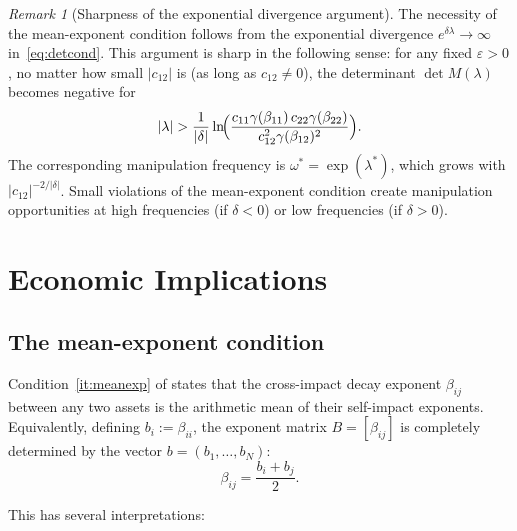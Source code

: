 \documentclass[12pt]{article}
\theoremstyle{definition}
\theoremstyle{remark}
\newtheorem{remark}[theorem]{Remark}
\begin{document}
\begin{remark}[Sharpness of the exponential divergence argument]\label{rem:sharpness}
The necessity of the mean-exponent condition follows from the exponential divergence
$e^{\delta\lambda}\to\infty$ in~\eqref{eq:detcond}.  This argument is sharp in the
following sense: for any fixed $\varepsilon > 0$, no matter how small $|c_{12}|$ is
(as long as $c_{12}\neq 0$), the determinant $\det M(\lambda)$ becomes negative for
\[
  |\lambda| > \frac{1}{|\delta|}
    \ln\!\Bigl(\frac{c_{11}\gamma(\beta_{11})\,c_{22}\gamma(\beta_{22})}{c_{12}^2\gamma(\beta_{12})^2}\Bigr).
\]
The corresponding manipulation frequency is
$\omega^* = \exp(\lambda^*)$, which grows with $|c_{12}|^{-2/|\delta|}$.
Small violations of the mean-exponent condition create manipulation opportunities at
high frequencies (if $\delta<0$) or low frequencies (if $\delta>0$).
\end{remark}


\section{Economic Implications}\label{sec:implications}

\subsection{The mean-exponent condition}\label{sec:meanexp}

Condition~\ref{it:meanexp} of  states that the cross-impact decay exponent
$\beta_{ij}$ between any two assets is the arithmetic mean of their self-impact exponents.
Equivalently, defining $b_i:=\beta_{ii}$, the exponent matrix $B=[\beta_{ij}]$ is completely
determined by the vector $b=(b_1,\dots,b_N)$:
\begin{equation}\label{eq:Bfromself}
  \beta_{ij} = \frac{b_i + b_j}{2}.
\end{equation}

This has several interpretations:
\end{document}
